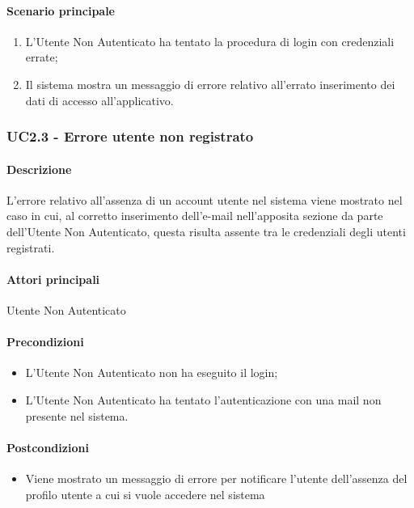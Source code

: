 \paragraph*{Scenario principale}
\begin{enumerate}
  \item L’Utente Non Autenticato ha tentato la procedura di login con credenziali errate;
  \item Il sistema mostra un messaggio di errore relativo all’errato inserimento dei dati di accesso all’applicativo.    
\end{enumerate}


\subsubsection{UC2.3 - Errore utente non registrato}\label{UC2point3}
\paragraph*{Descrizione}
L’errore relativo all’assenza di un account utente nel sistema viene mostrato nel caso in cui, al corretto inserimento dell’e-mail nell’apposita sezione da parte dell’Utente Non Autenticato, questa risulta assente tra le credenziali degli utenti registrati.

\paragraph*{Attori principali}
Utente Non Autenticato

\paragraph*{Precondizioni}
\begin{itemize}
  \item L’Utente Non Autenticato non ha eseguito il login;
  \item L’Utente Non Autenticato ha tentato l’autenticazione con una mail non presente nel sistema.  
\end{itemize}

\paragraph*{Postcondizioni}
\begin{itemize}
  \item Viene mostrato un messaggio di errore per notificare l’utente dell’assenza del profilo utente a cui si vuole accedere nel sistema
\end{itemize}


